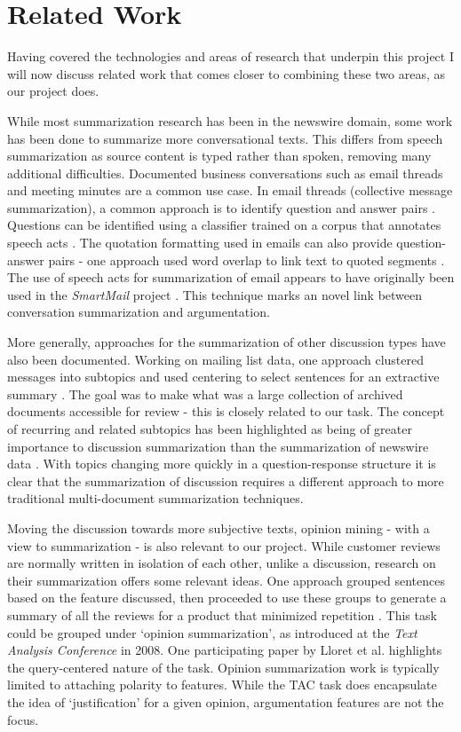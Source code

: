   \section{Related Work}
    Having covered the technologies and areas of research that underpin this project I will now discuss related work that comes closer to combining these two areas, as our project does.

    While most summarization research has been in the newswire domain, some work has been done to summarize more conversational texts. This differs from speech summarization as source content is typed rather than spoken, removing many additional difficulties. Documented business conversations such as email threads and meeting minutes are a common use case. In email threads (collective message summarization), a common approach is to identify question and answer pairs \cite{shrestha2007using,shrestha2004detection,carenini2007summarizing}. Questions can be identified using a classifier trained on a corpus that annotates speech acts \cite{shrestha2004detection}. The quotation formatting used in emails can also provide question-answer pairs - one approach used word overlap to link text to quoted segments \cite{carenini2007summarizing}. The use of speech acts for summarization of email appears to have originally been used in the \textit{SmartMail} project \cite{corston2004task}. This technique marks an novel link between conversation summarization and argumentation.

    More generally, approaches for the summarization of other discussion types have also been documented. Working on mailing list data, one approach clustered messages into subtopics and used centering to select sentences for an extractive summary \cite{newman2003summarizing}. The goal was to make what was a large collection of archived documents accessible for review - this is closely related to our task. The concept of recurring and related subtopics has been highlighted as being of greater importance to discussion summarization than the summarization of newswire data \cite{zhou2006summarization}. With topics changing more quickly in a question-response structure it is clear that the summarization of discussion requires a different approach to more traditional multi-document summarization techniques.

    Moving the discussion towards more subjective texts, opinion mining - with a view to summarization - is also relevant to our project. While customer reviews are normally written in isolation of each other, unlike a discussion, research on their summarization offers some relevant ideas. One approach grouped sentences based on the feature discussed, then proceeded to use these groups to generate a summary of all the reviews for a product that minimized repetition \cite{hu2004mining}. This task could be grouped under `opinion summarization', as introduced at the \textit{Text Analysis Conference} in 2008. One participating paper by Lloret et al. \cite{lloret2009towards} highlights the query-centered nature of the task. Opinion summarization work is typically limited to attaching polarity to features. While the TAC task does encapsulate the idea of `justification' for a given opinion, argumentation features are not the focus.

